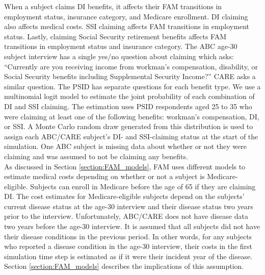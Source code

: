 \noindent When a subject claims DI benefits, it affects their FAM transitions in employment status, insurance category, and Medicare enrollment.
DI claiming also affects medical costs.
SSI claiming affects FAM transitions in employment status.
Lastly, claiming Social Security retirement benefits affects FAM transitions in employment status and insurance category.
The ABC age-30 subject interview has a single yes/no question about claiming which asks: ``Currently are you receiving income from workman's compensation, disability, or Social Security benefits including Supplemental Security Income?'' CARE asks a similar question. The PSID has separate questions for each benefit type. We use a multinomial logit model to estimate the joint probability of each combination of DI and SSI claiming. The estimation uses PSID respondents aged 25 to 35 who were claiming at least one of the following benefits: workman's compensation, DI, or SSI. A Monte Carlo random draw generated from this distribution is used to assign each ABC/CARE subject's DI- and SSI-claiming status at the start of the simulation. One ABC subject is missing data about whether or not they were claiming and was assumed to not be claiming any benefits.\\

\noindent As discussed in Section \ref{section:FAM_models}, FAM uses different models to estimate medical costs depending on whether or not a subject is Medicare-eligible. Subjects can enroll in Medicare before the age of 65 if they are claiming DI. The cost estimates for Medicare-eligible subjects depend on the subjects' current disease status at the age-30 interview and their disease status two years prior to the interview. Unfortunately, ABC/CARE does not have disease data two years before the age-30 interview. It is assumed that all subjects did not have their disease conditions in the previous period. In other words, for any subjects who reported a disease condition in the age-30 interview, their costs in the first simulation time step is estimated as if it were their incident year of the disease. Section \ref{section:FAM_models} describes the implications of this assumption. \\




